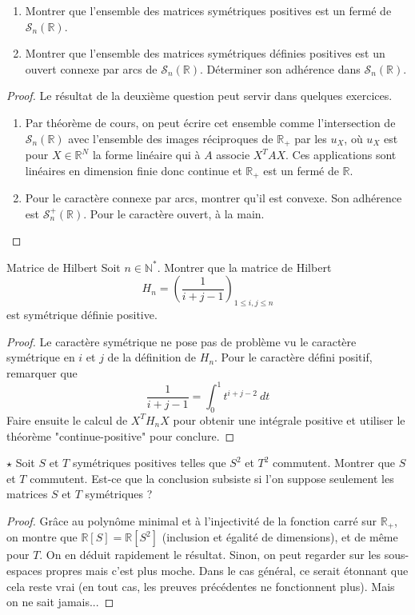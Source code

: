 \documentclass[french,a4paper]{article}
\newcommand{\N}{\mathbb{N}}
\newcommand{\R}{\mathbb{R}}
\newcommand{\st}{^*}
\theoremstyle{plain}
\theoremstyle{definition}
\theoremstyle{remark}
\begin{document}
\begin{ex}{}
	\begin{enumerate}
		\item Montrer que l'ensemble des matrices symétriques positives est un fermé de $\mathcal{S}_n(\R)$.
		\item Montrer que l'ensemble des matrices symétriques définies positives est un ouvert connexe par arcs de $\mathcal{S}_n(\R)$. Déterminer son adhérence dans $\mathcal{S}_n(\R)$.
	\end{enumerate}
\end{ex}
\begin{proof}
	Le résultat de la deuxième question peut servir dans quelques exercices.
	\begin{enumerate}
		\item Par théorème de cours, on peut écrire cet ensemble comme l'intersection de $\mathcal{S}_n(\R)$ avec l'ensemble des images réciproques de $\R_+$ par les $u_X$, où $u_X$ est pour $X\in\R^N$ la forme linéaire qui à $A$ associe $X^TAX$. Ces applications sont linéaires en dimension finie donc continue et $\R_+$ est un fermé de $\R$.
		\item Pour le caractère connexe par arcs, montrer qu'il est convexe. Son adhérence est $\mathcal{S}_n^+(\R)$. Pour le caractère ouvert, à la main.
	\end{enumerate}
\end{proof}

\begin{ex}{Matrice de Hilbert}
	Soit $n\in\N\st$. Montrer que la matrice de Hilbert $$H_n=\left(\frac{1}{i+j-1}\right)_{1\leqslant i,j\leqslant n}$$ est symétrique définie positive.
\end{ex}
\begin{proof}
	Le caractère symétrique ne pose pas de problème vu le caractère symétrique en $i$ et $j$ de la définition de $H_n$. Pour le caractère défini positif, remarquer que $$\frac{1}{i+j-1}=\int_{0}^{1}t^{i+j-2}\ dt$$ Faire ensuite le calcul de $X^TH_nX$ pour obtenir une intégrale positive et utiliser le théorème "continue-positive" pour conclure.
\end{proof}

\begin{ex}{$\star$}
	Soit $S$ et $T$ symétriques positives telles que $S^2$ et $T^2$ commutent. Montrer que $S$ et $T$ commutent. Est-ce que la conclusion subsiste si l'on suppose seulement les matrices $S$ et $T$ symétriques ?
\end{ex}
\begin{proof}
	Grâce au polynôme minimal et à l'injectivité de la fonction carré sur $\R_+$, on montre que $\R[S]=\R[S^2]$ (inclusion et égalité de dimensions), et de même pour $T$. On en déduit rapidement le résultat. Sinon, on peut regarder sur les sous-espaces propres mais c'est plus moche. Dans le cas général, ce serait étonnant que cela reste vrai (en tout cas, les preuves précédentes ne fonctionnent plus). Mais on ne sait jamais...
\end{proof}
\end{document}
